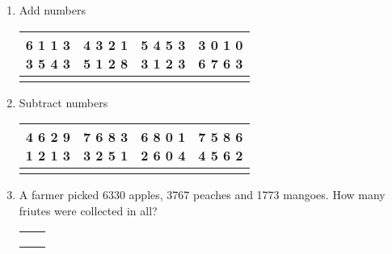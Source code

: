 \begin{enumerate}

    \item Add numbers

    \begin{myTableStyle} \begin{tabular}{ |m{1.5cm}|m{1.5cm}|m{1.5cm}|m{1.5cm}| } \hline
        \makecell[l]{6 1 1 3\\3 5 4 3} & \makecell[l]{4 3 2 1 \\5 1 2 8 }
                                    & \makecell[l]{5 4 5 3 \\3 1 2 3} & \makecell[l]{3 0 1 0 \\ 6 7 6 3} \\\hline
        &&& \\\hline
    \end{tabular} \end{myTableStyle} \vspace{0.08in}

    \item Subtract numbers

    \begin{myTableStyle} \begin{tabular}{ |m{1.5cm}|m{1.5cm}|m{1.5cm}|m{1.5cm}| } \hline
        \makecell[l]{4 6 2 9\\1 2 1 3} & \makecell[l]{7 6 8 3 \\3 2 5 1  }
                                    & \makecell[l]{6 8 0 1 \\2 6 0 4} & \makecell[l]{7 5 8 6 \\ 4 5 6 2} \\\hline
        &&& \\\hline
    \end{tabular} \end{myTableStyle} \vspace{0.08in}

    \item A farmer picked 6330 apples, 3767 peaches and 1773 mangoes. How many friutes were collected in all?

    \begin{myTableStyle} \begin{tabular}{ |m{10cm}|m{3cm}| } \hline
        &  \\\hline
        &  \\\hline
        &  \\\hline
        \multicolumn{2}{|c|}{} \\\hline
    \end{tabular} \end{myTableStyle} \vspace{0.08in}


\end{enumerate}
